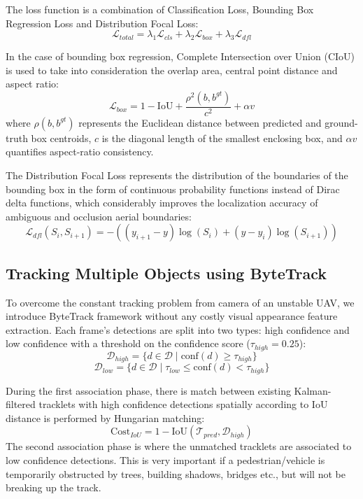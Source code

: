 \documentclass[conference]{IEEEtran}
\begin{document}
The loss function is a combination of Classification Loss, Bounding Box Regression Loss and Distribution Focal Loss:
\begin{equation}
\mathcal{L}_{total} = \lambda_1 \mathcal{L}_{cls} + \lambda_2 \mathcal{L}_{box} + \lambda_3 \mathcal{L}_{dfl}
\label{eq:total_loss}
\end{equation}

In the case of bounding box regression, Complete Intersection over Union (CIoU) is used to take into consideration the overlap area, central point distance and aspect ratio:
\begin{equation}
\mathcal{L}_{box} = 1 - \text{IoU} + \frac{\rho^2(b, b^{gt})}{c^2} + \alpha v
\label{eq:ciou}
\end{equation}
where $\rho(b, b^{gt})$ represents the Euclidean distance between predicted and ground-truth box centroids, $c$ is the diagonal length of the smallest enclosing box, and $\alpha v$ quantifies aspect-ratio consistency.

The Distribution Focal Loss represents the distribution of the boundaries of the bounding box in the form of continuous probability functions instead of Dirac delta functions, which considerably improves the localization accuracy of ambiguous and occlusion aerial boundaries:
\begin{equation}
\mathcal{L}_{dfl}(S_i, S_{i+1}) = - \left( (y_{i+1} - y)\log(S_i) + (y - y_i)\log(S_{i+1}) \right)
\label{eq:dfl}
\end{equation}

\subsection{Tracking Multiple Objects using ByteTrack}
To overcome the constant tracking problem from camera of an unstable UAV, we introduce ByteTrack framework without any costly visual appearance feature extraction. Each frame's detections are split into two types: high confidence and low confidence with a threshold on the confidence score ($\tau_{high} = 0.25$):
\begin{equation}
\mathcal{D}_{high} = \{d \in \mathcal{D} \mid \text{conf}(d) \ge \tau_{high}\}
\end{equation}
\begin{equation}
\mathcal{D}_{low} = \{d \in \mathcal{D} \mid \tau_{low} \le \text{conf}(d) < \tau_{high}\}
\end{equation}

During the first association phase, there is match between existing Kalman-filtered tracklets with high confidence detections spatially according to IoU distance is performed by Hungarian matching:
\begin{equation}
\text{Cost}_{IoU} = 1 - \text{IoU}(\mathcal{T}_{pred}, \mathcal{D}_{high})
\end{equation}
The second association phase is where the unmatched tracklets are associated to low confidence detections. This is very important if a pedestrian/vehicle is temporarily obstructed by trees, building shadows, bridges etc., but will not be breaking up the track.
\end{document}
